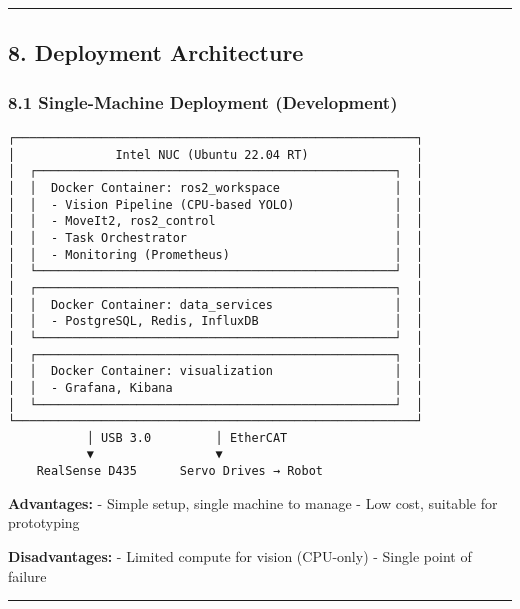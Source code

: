 \documentclass[
]{article}
\begin{document}
\begin{center}\rule{0.5\linewidth}{0.5pt}\end{center}

\hypertarget{deployment-architecture}{%
\subsection{8. Deployment Architecture}\label{deployment-architecture}}

\hypertarget{single-machine-deployment-development}{%
\subsubsection{8.1 Single-Machine Deployment
(Development)}\label{single-machine-deployment-development}}

\begin{verbatim}
┌────────────────────────────────────────────────────────┐
│              Intel NUC (Ubuntu 22.04 RT)               │
│  ┌──────────────────────────────────────────────────┐  │
│  │  Docker Container: ros2_workspace                │  │
│  │  - Vision Pipeline (CPU-based YOLO)              │  │
│  │  - MoveIt2, ros2_control                         │  │
│  │  - Task Orchestrator                             │  │
│  │  - Monitoring (Prometheus)                       │  │
│  └──────────────────────────────────────────────────┘  │
│  ┌──────────────────────────────────────────────────┐  │
│  │  Docker Container: data_services                 │  │
│  │  - PostgreSQL, Redis, InfluxDB                   │  │
│  └──────────────────────────────────────────────────┘  │
│  ┌──────────────────────────────────────────────────┐  │
│  │  Docker Container: visualization                 │  │
│  │  - Grafana, Kibana                               │  │
│  └──────────────────────────────────────────────────┘  │
└────────────────────────────────────────────────────────┘
           │ USB 3.0         │ EtherCAT
           ▼                 ▼
    RealSense D435      Servo Drives → Robot
\end{verbatim}

\textbf{Advantages:} - Simple setup, single machine to manage - Low
cost, suitable for prototyping

\textbf{Disadvantages:} - Limited compute for vision (CPU-only) - Single
point of failure

\begin{center}\rule{0.5\linewidth}{0.5pt}\end{center}
\end{document}
